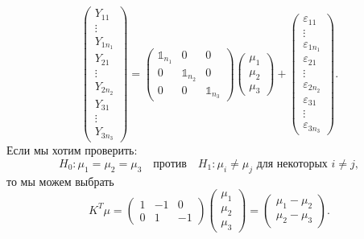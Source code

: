 \begin{exmp}
\begin{enumerate}
\[\begin{pmatrix}
		Y_{11} \\
		\vdots \\
		Y_{1n_1} \\
		Y_{21} \\
		\vdots \\
		Y_{2n_2} \\
		Y_{31} \\
		\vdots \\
		Y_{3n_3}
		\end{pmatrix}
		=
		\begin{pmatrix}
		\mathds{1}_{n_1} & 0 & 0 \\
		0 & \mathds{1}_{n_2} & 0 \\
		0 & 0 & \mathds{1}_{n_3}
		\end{pmatrix}
		\begin{pmatrix}
		\mu_1 \\
		\mu_2 \\
		\mu_3
		\end{pmatrix}
		+
		\begin{pmatrix}
		\varepsilon_{11} \\
		\vdots \\
		\varepsilon_{1n_1} \\
		\varepsilon_{21} \\
		\vdots \\
		\varepsilon_{2n_2} \\
		\varepsilon_{31} \\
		\vdots \\
		\varepsilon_{3n_3}
		\end{pmatrix}.
		\]
		Если мы хотим проверить:
		\[H_0: \mu_1 = \mu_2 = \mu_3 \quad \text{против} \quad H_1:\mu_i \neq \mu_j \text{ для некоторых } i \neq j,\]
		то мы можем выбрать
		\[ K^T\mu = \begin{pmatrix}
		1 & -1 & 0 \\
		0 & 1 & -1
		\end{pmatrix}
		\begin{pmatrix}
		\mu_1 \\
		\mu_2 \\
		\mu_3
		\end{pmatrix}
		=
		\begin{pmatrix}
		\mu_1 - \mu_2 \\
		\mu_2 - \mu_3
		\end{pmatrix}.  \]
	\end{enumerate}
\end{exmp}

